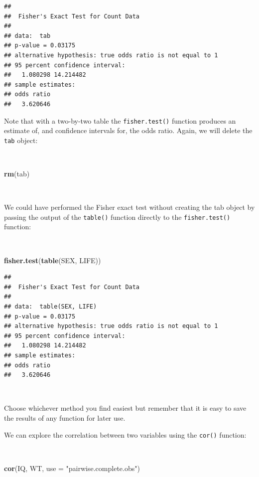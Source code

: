 \documentclass[12pt,a4paper]{book}
\newenvironment{Shaded}{\begin{snugshade}}{\end{snugshade}}
\newcommand{\DataTypeTok}[1]{\textcolor[rgb]{0.13,0.29,0.53}{#1}}
\newcommand{\KeywordTok}[1]{\textcolor[rgb]{0.13,0.29,0.53}{\textbf{#1}}}
\newcommand{\NormalTok}[1]{#1}
\newcommand{\StringTok}[1]{\textcolor[rgb]{0.31,0.60,0.02}{#1}}
\theoremstyle{definition}
\theoremstyle{definition}
\theoremstyle{definition}
\theoremstyle{remark}
\begin{document}
\begin{verbatim}
## 
##  Fisher's Exact Test for Count Data
## 
## data:  tab
## p-value = 0.03175
## alternative hypothesis: true odds ratio is not equal to 1
## 95 percent confidence interval:
##   1.080298 14.214482
## sample estimates:
## odds ratio 
##   3.620646
\end{verbatim}

\newpage

Note that with a two-by-two table the \texttt{fisher.test()} function
produces an estimate of, and confidence intervals for, the odds ratio.
Again, we will delete the \texttt{tab} object:

~

\begin{Shaded}
\begin{Highlighting}[]
\KeywordTok{rm}\NormalTok{(tab)}
\end{Highlighting}
\end{Shaded}

~

We could have performed the Fisher exact test without creating the tab
object by passing the output of the \texttt{table()} function directly
to the \texttt{fisher.test()} function:

~

\begin{Shaded}
\begin{Highlighting}[]
\KeywordTok{fisher.test}\NormalTok{(}\KeywordTok{table}\NormalTok{(SEX, LIFE))}
\end{Highlighting}
\end{Shaded}

\begin{verbatim}
## 
##  Fisher's Exact Test for Count Data
## 
## data:  table(SEX, LIFE)
## p-value = 0.03175
## alternative hypothesis: true odds ratio is not equal to 1
## 95 percent confidence interval:
##   1.080298 14.214482
## sample estimates:
## odds ratio 
##   3.620646
\end{verbatim}

~

Choose whichever method you find easiest but remember that it is easy to
save the results of any function for later use.

We can explore the correlation between two variables using the
\texttt{cor()} function:

~

\begin{Shaded}
\begin{Highlighting}[]
\KeywordTok{cor}\NormalTok{(IQ, WT, }\DataTypeTok{use =} \StringTok{"pairwise.complete.obs"}\NormalTok{)}
\end{Highlighting}
\end{Shaded}
\end{document}
